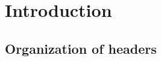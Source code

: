 %
%
%
%

\chapter{Introduction}
\label{chap:Introduction}

\section{Organization of headers}
\label{sec:Organization of headers}

